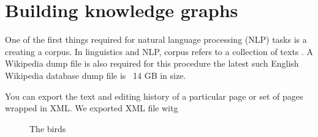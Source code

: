 \chapter{Building knowledge graphs}


One of the first things required for natural language processing (NLP) tasks is a creating a corpus. In linguistics and NLP, corpus refers to a collection of texts \parencite{wkpd}.
A Wikipedia dump file is also required for this procedure the latest such English Wikipedia database dump file is ~14 GB in size.

You can export the text and editing history of a particular page or set of pages wrapped in XML. \cite{kdnug}
We exported XML file witg 

\begin{figure}[h!]
    \centering
    
    \caption{The birds}
    \label{fig:birds}
\end{figure}


